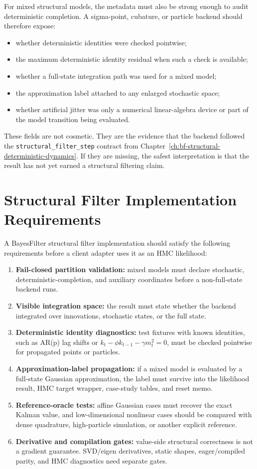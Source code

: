For mixed structural models, the metadata must also be strong enough to audit
deterministic completion.  A sigma-point, cubature, or particle backend should
therefore expose:
\begin{itemize}
  \item whether deterministic identities were checked pointwise;
  \item the maximum deterministic identity residual when such a check is
    available;
  \item whether a full-state integration path was used for a mixed model;
  \item the approximation label attached to any enlarged stochastic space;
  \item whether artificial jitter was only a numerical linear-algebra device or
    part of the model transition being evaluated.
\end{itemize}
These fields are not cosmetic.  They are the evidence that the backend followed
the \texttt{structural\_filter\_step} contract from
Chapter~\ref{ch:bf-structural-deterministic-dynamics}.  If they are missing,
the safest interpretation is that the result has not yet earned a structural
filtering claim.

\section{Structural Filter Implementation Requirements}
\label{sec:bf-api-structural-filter-requirements}

A BayesFilter structural filter implementation should satisfy the following
requirements before a client adapter uses it as an HMC likelihood:
\begin{enumerate}[label=(\roman*)]
  \item \textbf{Fail-closed partition validation:} mixed models must declare
    stochastic, deterministic-completion, and auxiliary coordinates before a
    non-full-state backend runs.
  \item \textbf{Visible integration space:} the result must state whether the
    backend integrated over innovations, stochastic states, or the full state.
  \item \textbf{Deterministic identity diagnostics:} test fixtures with known
    identities, such as AR(p) lag shifts or
    $k_t-\phi k_{t-1}-\gamma m_t^2=0$, must be checked pointwise for propagated
    points or particles.
  \item \textbf{Approximation-label propagation:} if a mixed model is evaluated
    by a full-state Gaussian approximation, the label must survive into the
    likelihood result, HMC target wrapper, case-study tables, and reset memo.
  \item \textbf{Reference-oracle tests:} affine Gaussian cases must recover the
    exact Kalman value, and low-dimensional nonlinear cases should be compared
    with dense quadrature, high-particle simulation, or another explicit
    reference.
  \item \textbf{Derivative and compilation gates:} value-side structural
    correctness is not a gradient guarantee.  SVD/eigen derivatives, static
    shapes, eager/compiled parity, and HMC diagnostics need separate gates.
\end{enumerate}

